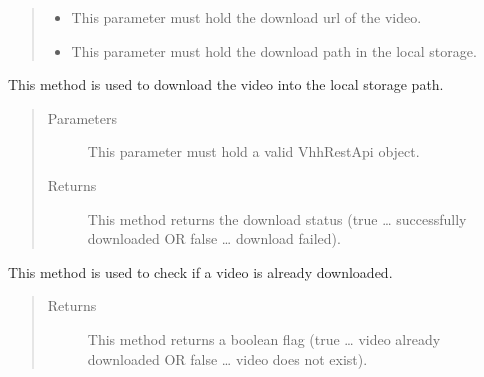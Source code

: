 \documentclass[letterpaper,10pt,english,openany,oneside]{sphinxmanual}
\begin{document}
\begin{fulllineitems}
\begin{fulllineitems}
\begin{quote}
\begin{description}
\begin{itemize}
\item {} 
 \textendash{} This parameter must hold the download url of the video.

\item {} 
 \textendash{} This parameter must hold the download path in the local storage.

\end{itemize}

\end{description}\end{quote}

\end{fulllineitems}


\begin{fulllineitems}
\label{\detokenize{Video:Video.Video.download}}
This method is used to download the video into the local storage path.
\begin{quote}\begin{description}
\item[{Parameters}] \leavevmode
{} \textendash{} This parameter must hold a valid VhhRestApi object.

\item[{Returns}] \leavevmode
This method returns the download status (true … successfully downloaded OR false … download failed).

\end{description}\end{quote}

\end{fulllineitems}


\begin{fulllineitems}
\label{\detokenize{Video:Video.Video.is_downloaded}}
This method is used to check if a video is already downloaded.
\begin{quote}\begin{description}
\item[{Returns}] \leavevmode
This method returns a boolean flag (true … video already downloaded OR false … video does not exist).


\end{description}
\end{quote}
\end{fulllineitems}
\end{fulllineitems}
\end{document}
